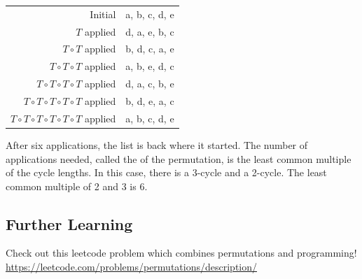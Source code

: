 \begin{tabular}{r | l}
  Initial & {\color{red} a, b,} {\color{blue} c,} {\color{red} d,} {\color{blue} e} \\ 
  $T$ applied & {\color{red} d, a,}  {\color{blue} e,} {\color{red} b,} {\color{blue} c}\\
  $T \circ T$ applied & {\color{red} b, d,} {\color{blue} c,} {\color{red} a,}  {\color{blue} e} \\
  $T \circ T \circ T$ applied & {\color{red} a, b,}  {\color{blue} e,} {\color{red} d,} {\color{blue} c} \\
  $T \circ T \circ T \circ T$ applied & {\color{red} d, a,} {\color{blue} c,} {\color{red}b,}  {\color{blue} e} \\
  $T \circ T \circ T \circ T \circ T$ applied & {\color{red} b, d,}  {\color{blue} e,} {\color{red} a,} {\color{blue} c} \\
  $T \circ T \circ T \circ T \circ T \circ T$ applied & {\color{red} a, b,} {\color{blue} c,} {\color{red} d,}  {\color{blue} e}\\
\end{tabular}

After six applications, the list is back where it started. The number of
applications needed, called the  of the permutation, is the
least common multiple of the cycle lengths.  In this case, there is a 3-cycle and a 2-cycle. The
least common multiple of 2 and 3 is 6.

\subsection{Further Learning}
Check out this leetcode problem which combines permutations and programming! 
\url{https://leetcode.com/problems/permutations/description/}
